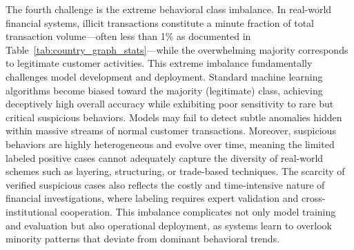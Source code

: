 The fourth challenge is the extreme behavioral class imbalance. In real-world financial systems, illicit transactions constitute a minute fraction of total transaction volume—often less than 1\% as documented in Table~\ref{tab:country_graph_stats}—while the overwhelming majority corresponds to legitimate customer activities. This extreme imbalance fundamentally challenges model development and deployment. Standard machine learning algorithms become biased toward the majority (legitimate) class, achieving deceptively high overall accuracy while exhibiting poor sensitivity to rare but critical suspicious behaviors. Models may fail to detect subtle anomalies hidden within massive streams of normal customer transactions. Moreover, suspicious behaviors are highly heterogeneous and evolve over time, meaning the limited labeled positive cases cannot adequately capture the diversity of real-world schemes such as layering, structuring, or trade-based techniques. The scarcity of verified suspicious cases also reflects the costly and time-intensive nature of financial investigations, where labeling requires expert validation and cross-institutional cooperation. This imbalance complicates not only model training and evaluation but also operational deployment, as systems learn to overlook minority patterns that deviate from dominant behavioral trends. 



